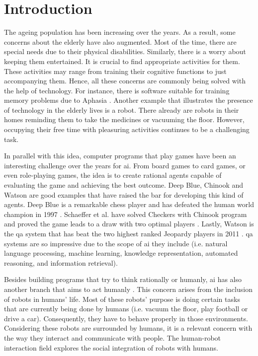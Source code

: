 \section{Introduction} \label{introduction}

The ageing population has been increasing over the years.
As a result, some concerns about the elderly have also augmented.
Most of the time, there are special needs due to their physical disabilities.
Similarly, there is a worry about keeping them entertained.
It is crucial to find appropriate activities for them.
These activities may range from training their cognitive functions to just accompanying them.
Hence, all these concerns are commonly being solved with the help of technology.
For instance, there is software suitable for training memory problems due to Aphasia \cite{Pompili2011}.
Another example that illustrates the presence of technology in the elderly lives is a robot.
There already are robots in their homes reminding them to take the medicines or vacuuming the floor.
However, occupying their free time with pleasuring activities continues to be a challenging task.


In parallel with this idea, computer programs that play games have been an interesting challenge over the years for \gls{ai}.
From board games to card games, or even role-playing games, the idea is to create rational agents capable of evaluating the game and achieving the best outcome.
Deep Blue, Chinook and Watson are good examples that have raised the bar for developing this kind of agents.
Deep Blue is a remarkable chess player and has defeated the human world champion in 1997 \cite{Campbell2002}.
Schaeffer et al. have solved Checkers with Chinook program and proved the game leads to a draw with two optimal players \cite{Schaeffer1996}.
Lastly, Watson is the \gls{qa} system that has beat the two highest ranked Jeopardy players in 2011 \cite{Ferrucci2010}.
\gls{qa} systems are so impressive due to the scope of \gls{ai} they include (i.e. natural language processing, machine learning, knowledge representation, automated reasoning, and information retrieval).

Besides building programs that try to think rationally or humanly, \gls{ai} has also another branch that aims to act humanly \cite{Russell2009}.
This concern arises from the inclusion of robots in humans' life.
Most of these robots' purpose is doing certain tasks that are currently being done by humans (i.e. vacuum the floor, play football or drive a car).
Consequently, they have to behave properly in those environments.
Considering these robots are surrounded by humans, it is a relevant concern with the way they interact and communicate with people.
The human-robot interaction field explores the social integration of robots with humans.


